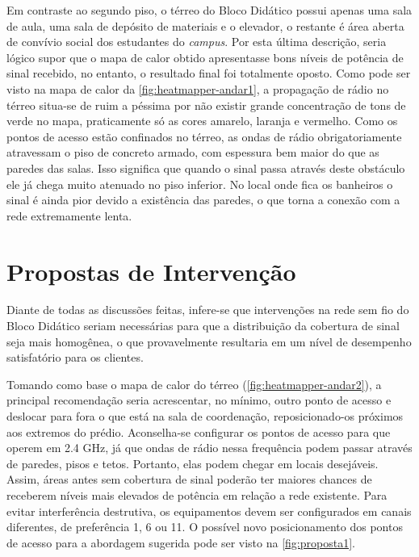 Em contraste ao segundo piso, o térreo do Bloco Didático possui apenas uma sala de aula, uma sala de depósito de materiais e o elevador, o restante é área aberta de convívio social dos estudantes do \textit{campus}. Por esta última descrição, seria lógico supor que o mapa de calor obtido apresentasse bons níveis de potência de sinal recebido, no entanto, o resultado final foi totalmente oposto. Como pode ser visto na mapa de calor da \autoref{fig:heatmapper-andar1}, a propagação de rádio no térreo situa-se de ruim a péssima por não existir grande concentração de tons de verde no mapa, praticamente só as cores amarelo, laranja e vermelho. Como os pontos de acesso estão confinados no térreo, as ondas de rádio obrigatoriamente atravessam o piso de concreto armado, com espessura bem maior do que as paredes das salas. Isso significa que quando o sinal passa através deste obstáculo ele já chega muito atenuado no piso inferior. No local onde fica os banheiros o sinal é ainda pior devido a existência das paredes, o que torna a conexão com a rede extremamente lenta.

\section{Propostas de Intervenção}
\label{propostas-de-intervencao}

Diante de todas as discussões feitas, infere-se que intervenções na rede sem fio do Bloco Didático seriam necessárias para que a distribuição da cobertura de sinal seja mais homogênea, o que provavelmente resultaria em um nível de desempenho satisfatório para os clientes.

Tomando como base o mapa de calor do térreo (\autoref{fig:heatmapper-andar2}), a principal recomendação seria acrescentar, no mínimo, outro ponto de acesso e deslocar para fora o que está na sala de coordenação, reposicionado-os próximos aos extremos do prédio. Aconselha-se configurar os pontos de acesso para que operem em 2.4 GHz, já que ondas de rádio nessa frequência podem passar através de paredes, pisos e tetos. Portanto, elas podem chegar em locais desejáveis. Assim, áreas antes sem cobertura de sinal poderão ter maiores chances de receberem níveis mais elevados de potência em relação a rede existente. Para evitar interferência destrutiva, os equipamentos devem ser configurados em canais diferentes, de preferência 1, 6 ou 11. O possível novo posicionamento dos pontos de acesso para a abordagem sugerida pode ser visto na \autoref{fig:proposta1}.

